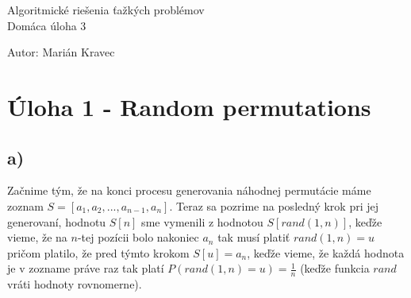 \documentclass[a4paper]{article}
\begin{document}
 
	
\pagestyle{plain}

\begin{center}
	\sc\large
	Algoritmické riešenia ťažkých problémov\\
	Domáca úloha 3
\end{center}

Autor: Marián Kravec

\section{Úloha 1 -  Random permutations}

\subsection*{a)}

Začnime tým, že na konci procesu generovania náhodnej permutácie máme zoznam $S=[a_1,a_2,...,a_{n-1}, a_n]$. Teraz sa pozrime na posledný krok pri jej generovaní, hodnotu $S[n]$ sme vymenili z hodnotou $S[rand(1, n)]$, keďže vieme, že na $n$-tej pozícii bolo nakoniec $a_n$ tak musí platiť $rand(1, n)=u$ pričom platilo, že pred týmto krokom $S[u]=a_n$, keďže vieme, že každá hodnota je v zozname práve raz tak platí $P(rand(1, n)=u) = \frac{1}{n}$ (keďže funkcia $rand$ vráti hodnoty rovnomerne). 
  
 
\end{document}
